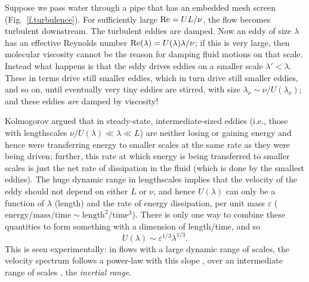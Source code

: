 Suppose we pass water through a pipe that has an embedded mesh screen (Fig.~\ref{f.turbulence}).  For sufficiently large $\mathrm{Re} = UL/\nu$, the flow becomes turbulent downstream. The turbulent eddies are damped.  Now an eddy of size $\lambda$ has an effective Reynolds number $\mathrm{Re}(\lambda) = U(\lambda)\lambda/\nu$; if this is very large, then molecular viscosity cannot be the reason for damping fluid motions on that scale. Instead what happens is that the eddy drives eddies on a smaller scale $\lambda' < \lambda$. These in terms drive still smaller eddies, which in turn drive still smaller eddies, and so on, until eventually very tiny eddies are stirred, with size $\lambda_{\nu} \sim \nu/U(\lambda_{\nu})$; and these eddies \emph{are} damped by viscosity!

Kolmogorov argued that in steady-state, intermediate-sized eddies (i.e., those with lengthscales $\nu/U(\lambda) \ll \lambda \ll L$) are neither losing or gaining energy and hence were transferring energy to smaller scales at the same rate as they were being driven; further, this rate at which energy is being transferred to smaller scales is just the net rate of dissipation in the fluid (which is done by the smallest eddies).  The huge dynamic range in lengthscales implies that the velocity of the eddy should not depend on either $L$ or $\nu$, and hence $U(\lambda)$ can only be a function of $\lambda$ (length) and the rate of energy dissipation, per unit mass $\varepsilon$ ($\mathrm{energy/mass/time}\sim\mathrm{length^{2}/time^{3}}$). There is only one way to combine these quantities to form something with a dimension of length/time, and so
\begin{equation}\label{e.kolmogorov-velocity}
U(\lambda) \sim \varepsilon^{1/3}\lambda^{1/3}.
\end{equation}
This is seen experimentally: in flows with a large dynamic range of scales, the velocity spectrum follows a power-law with this slope \citep[see][]{Grant1962Turbulence-spec}, over an intermediate range of scales , the \emph{inertial range}.

